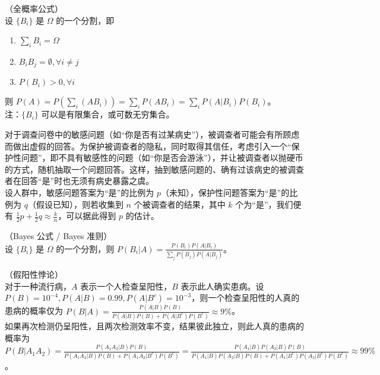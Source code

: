 \documentclass[../main.tex]{subfiles}
\begin{document}
\begin{theorem}\label{thm:1.8.1}
    （全概率公式）\\
    设 $\{B_i\}$ 是 $\Omega$ 的一个分割，即
    \begin{enumerate}
        \item $\sum_iB_i=\Omega$
        \item $B_iB_j=\emptyset,\forall i\neq j$
        \item $P(B_i)>0,\forall i$
    \end{enumerate}
    则 $P(A)=P(\sum_{i}(AB_i))=\sum_iP(AB_i)=\sum_iP(A|B_i)P(B_i)$。\\
    注：$\{B_i\}$ 可以是有限集合，或可数无穷集合。
\end{theorem}

\begin{example}
    对于调查问卷中的敏感问题（如“你是否有过某病史”），被调查者可能会有所顾虑而做出虚假的回答。为保护被调查者的隐私，同时取得其信任，考虑引入一个“保护性问题”，即不具有敏感性的问题（如“你是否会游泳”），并让被调查者以抛硬币的方式，随机抽取一个问题回答。这样，抽到敏感问题的、确有过该病史的被调查者在回答“是”时也无须有病史暴露之虞。\\
    设人群中，敏感问题答案为“是”的比例为 $p$（未知），保护性问题答案为“是”的比例为 $q$（假设已知），则若收集到 $n$ 个被调查者的结果，其中 $k$ 个为“是”，我们便有 $\frac{1}{2}p+\frac{1}{2}q\approx \frac{k}{n}$，可以据此得到 $p$ 的估计。
\end{example}

\begin{theorem}\label{thm:1.8.2}
    （Bayes 公式 / Bayes 准则）\\
    设 $\{B_i\}$ 是 $\Omega$ 的一个分割，则 $P(B_i|A)=\frac{P(B_i)P(A|B_i)}{\sum_j P(B_j)P(A|B_j)}$。
\end{theorem}

\begin{example}
    （假阳性悖论）\\
    对于一种流行病，$A$ 表示一个人检查呈阳性，$B$ 表示此人确实患病。设 $P(B)=10^{-4},P(A|B)=0.99,P(A|B^c)=10^{-3}$，则一个检查呈阳性的人真的患病的概率仅为 $P(B|A)=\frac{P(A|B)P(B)}{P(A|B)P(B)+P(A|B^c)P(B^c)}\approx 9\%$。\\
    如果再次检测仍呈阳性，且两次检测效率不变，结果彼此独立，则此人真的患病的概率为 $P(B|A_1A_2)=\frac{P(A_1A_2|B)P(B)}{P(A_1A_2|B)P(B)+P(A_1A_2|B^c)P(B^c)}=\frac{P(A_1|B)P(A_2|B)P(B)}{P(A_1|B)P(A_2|B)P(B)+P(A_1|B^c)P(A_2|B^c)P(B^c)}\approx 99\%$。
\end{example}
\end{document}
